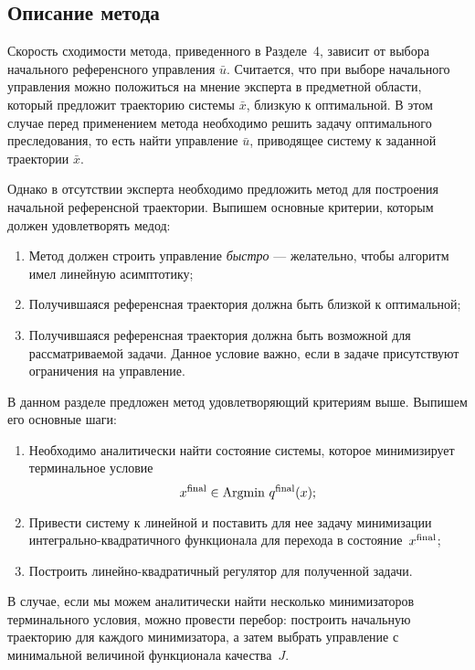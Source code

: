 \documentclass[../../doc.tex]{subfiles}
\begin{document}
    \subsection{Описание метода}

    Скорость сходимости метода, приведенного в Разделе~4,
        зависит от выбора начального референсного управления $\bar u$.
    Считается, что при выборе начального управления
        можно положиться на мнение эксперта в предметной области,
        который предложит траекторию системы $\bar x$, близкую к оптимальной.
    В этом случае перед применением метода
        необходимо решить задачу оптимального преследования,
        то есть найти управление $\bar u$, приводящее систему к заданной траектории $\bar x$.
    
    Однако в отсутствии эксперта необходимо предложить метод для построения начальной референсной траектории.
    Выпишем основные критерии, которым должен удовлетворять медод:

    \begin{enumerate}\itemsep0em
        \item Метод должен строить управление \textit{быстро} --- желательно, чтобы алгоритм имел линейную асимптотику;
        \item Получившаяся референсная траектория должна быть близкой к оптимальной;
        \item Получившаяся референсная траектория должна быть возможной для рассматриваемой задачи. Данное условие важно, если в задаче присутствуют ограничения на управление.
    \end{enumerate}
    
    В данном разделе предложен метод удовлетворяющий критериям выше. Выпишем его основные шаги:
    \begin{enumerate}
        \item Необходимо аналитически найти состояние системы, которое минимизирует терминальное условие
        $$
            x^{\textnormal{final}} \in \textnormal{Argmin } q^{\textnormal{final}}(x);
        $$
        \item Привести систему к линейной и поставить для нее задачу минимизации интегрально-квадратичного функционала для перехода в состояние~$x^{\textnormal{final}}$;
        \item Построить линейно-квадратичный регулятор для полученной задачи.
    \end{enumerate}
    В случае, если мы можем аналитически найти несколько минимизаторов терминального условия,
    можно провести перебор: построить начальную траекторию для каждого минимизатора,
    а затем выбрать управление с минимальной величиной функционала качества~$J$.
\end{document}
